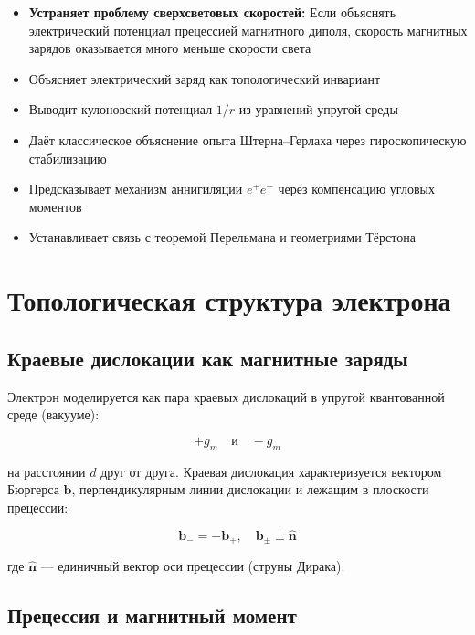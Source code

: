 \documentclass[12pt]{article}
\begin{document}
\begin{itemize}
\item \textbf{Устраняет проблему сверхсветовых скоростей:} Если объяснять электрический потенциал прецессией магнитного диполя, скорость магнитных зарядов оказывается много меньше скорости света
\item Объясняет электрический заряд как топологический инвариант
\item Выводит кулоновский потенциал $1/r$ из уравнений упругой среды
\item Даёт классическое объяснение опыта Штерна–Герлаха через гироскопическую стабилизацию
\item Предсказывает механизм аннигиляции $e^+e^-$ через компенсацию угловых моментов
\item Устанавливает связь с теоремой Перельмана и геометриями Тёрстона
\end{itemize}

\section{Топологическая структура электрона}

\subsection{Краевые дислокации как магнитные заряды}

Электрон моделируется как пара краевых дислокаций в упругой квантованной среде (вакууме):

\begin{equation}
+g_m \quad \text{и} \quad -g_m
\label{eq:magnetic_charges}
\end{equation}

на расстоянии $d$ друг от друга. Краевая дислокация характеризуется вектором Бюргерса $\boldsymbol{b}$, перпендикулярным линии дислокации и лежащим в плоскости прецессии:

\begin{equation}
\boldsymbol{b}_- = -\boldsymbol{b}_+, \quad \boldsymbol{b}_\pm \perp \hat{\boldsymbol{n}}
\label{eq:burgers_vector}
\end{equation}

где $\hat{\boldsymbol{n}}$ — единичный вектор оси прецессии (струны Дирака).

\subsection{Прецессия и магнитный момент}
\end{document}
